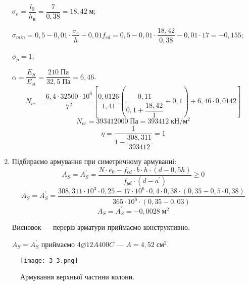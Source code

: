 \documentclass[a4paper,14pt]{article}
\begin{document}
\begin{enumerate}
    $\sigma_e = \dfrac{l_0}{h_\textit{н}} = \dfrac{7}{0,38} = 18,42\;\textit{м}$;

    $\sigma_{min} = 0,5 - 0,01 \cdot \dfrac{\sigma_e}{h} - 0,01f_{cd} =  0,5 - 0,01 \cdot \dfrac{18,42}{0,38} - 0,01 \cdot 17 = -0,155$;

    $\phi_p = 1$;

    $\alpha = \dfrac{E_S}{E_{ct}} = \dfrac{210\;\textit{Па}}{32,5\;\textit{Па}} = 6,46$.
    $$N_{cr} = \dfrac{6,4 \cdot 32500 \cdot 10^6}{7^2}\left[\dfrac{0,0126}{1,41}\left(\dfrac{0,11}{0,1 + \dfrac{18,42}{1}} + 0,1\right) + 6,46 \cdot 0,0142\right]$$
    $$N_{cr} = 393412000\;\textit{Па} = 393412\;\textit{кН}/\textit{м}^2$$
    $$\eta = \dfrac{1}{1 - \dfrac{308,311}{393412}} = 1$$
  
\item Підбираємо армування при симетричному армуванні:
    \begin{equation}
        A_S = A_S^\prime = \dfrac{N \cdot e_0 - f_{cd} \cdot b \cdot h \cdot (d - 0,5h)}{f_{yd} \cdot (d - a^\prime)} \geqslant 0
    \end{equation}
    $$A_S = A_S^\prime = \dfrac{308,311 \cdot 10^3 \cdot 0,25 - 17 \cdot 10^6 \cdot 0,4 \cdot 0,38 \cdot (0,35 - 0,5 \cdot 0,38)}{365 \cdot 10^6 \cdot (0,35 - 0,03)}$$
    $$A_S = A_S^\prime = -0,0028\;\textit{м}^2$$

    Висновок --- переріз арматури приймаємо конструктивно.

    $A_S = A_S^\prime$ приймаємо $4\varnothing12A400C$ --- $A = 4,52\;\textit{см}^2$.
\end{enumerate}
\begin{figure}[h!]
    \begin{center}
        \texttt{[image: 3\_3.png]}
        \caption{Армування верхньої частини колони.}\label{ris3_3} 
    \end{center}
\end{figure}
\newpage
\end{document}
